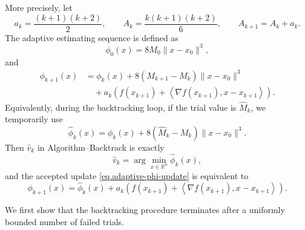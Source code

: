 \begin{itemize}
{              More precisely, let
              \[
                  a_k=\frac{(k+1)(k+2)}{2},
                  \qquad
                  A_k=\frac{k(k+1)(k+2)}{6},
                  \qquad
                  A_{k+1}=A_k+a_k.
              \]
              The adaptive estimating sequence is defined as
              \begin{equation}
                  \label{eq.adaptive-phi0}
                  \phi_0(x)=8M_0\|x-x_0\|^3,
              \end{equation}
              and
              \begin{equation}
                  \label{eq.adaptive-phi-update}
                  \begin{aligned}
                      \phi_{k+1}(x)
                       & =
                      \phi_k(x)
                      +
                      8(M_{k+1}-M_k)\|x-x_0\|^3 \\
                       & \quad
                      +
                      a_k
                      \left(
                      f(x_{k+1})
                      +
                      \left\langle \nabla f(x_{k+1}),x-x_{k+1}\right\rangle
                      \right).
                  \end{aligned}
              \end{equation}
              Equivalently, during the backtracking loop, if the trial value is \(\widehat M_k\), we temporarily use
              \begin{equation}
                  \label{eq.adaptive-temp-phi}
                  \widehat \phi_k(x)
                  =
                  \phi_k(x)
                  +
                  8(\widehat M_k-M_k)\|x-x_0\|^3.
              \end{equation}
              Then \(\widehat v_k\) in Algorithm--Backtrack is exactly
              \[
                  \widehat v_k=\arg\min_{x\in\mathbb R^n}\widehat \phi_k(x),
              \]
              and the accepted update \eqref{eq.adaptive-phi-update} is equivalent to
              \[
                  \phi_{k+1}(x)
                  =
                  \widehat \phi_k(x)
                  +
                  a_k
                  \left(
                  f(x_{k+1})
                  +
                  \left\langle \nabla f(x_{k+1}),x-x_{k+1}\right\rangle
                  \right).
              \]

              We first show that the backtracking procedure terminates after a uniformly bounded number of failed trials.

}
\end{itemize}
